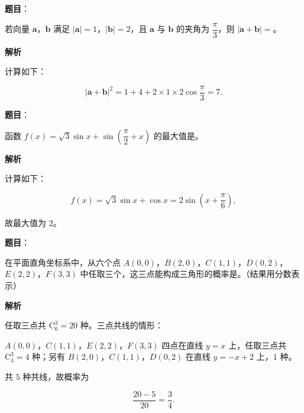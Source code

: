 \begin{answer}

\textbf{题目}：

若向量 $\boldsymbol a$，$\boldsymbol b$ 满足 $|\boldsymbol a|=1$，$|\boldsymbol b|=2$，且 $\boldsymbol a$ 与 $\boldsymbol b$ 的夹角为 $\dfrac{\pi}3$，则 $|\boldsymbol a+\boldsymbol b|=$\gkblank{}。

\textbf{解析}

计算如下：

\nopagebreak[4]
\[|\boldsymbol a+\boldsymbol b|^2=1+4+2\times1\times2\cos\frac{\pi}3=7.\]


\end{answer}
\begin{answer}

\textbf{题目}：

函数 $f(x)=\sqrt3\sin x+\sin\left(\dfrac{\pi}2+x\right)$ 的最大值是\gkblank{}。

\textbf{解析}

计算如下：

\nopagebreak[4]
\[f(x)=\sqrt3\sin x+\cos x=2\sin\left(x+\frac{\pi}6\right),\]

故最大值为 $2$。


\end{answer}
\begin{answer}

\textbf{题目}：

在平面直角坐标系中，从六个点 $A(0,0)$，$B(2,0)$，$C(1,1)$，$D(0,2)$，$E(2,2)$，$F(3,3)$ 中任取三个，这三点能构成三角形的概率是\gkblank{}。（结果用分数表示）

\textbf{解析}

任取三点共 $\mathrm C_6^3=20$ 种。三点共线的情形：

$A(0,0)$，$C(1,1)$，$E(2,2)$，$F(3,3)$ 四点在直线 $y=x$ 上，任取三点共 $\mathrm C_4^3=4$ 种；另有 $B(2,0)$，$C(1,1)$，$D(0,2)$ 在直线 $y=-x+2$ 上，$1$ 种。

共 $5$ 种共线，故概率为

\nopagebreak[4]
\[\frac{20-5}{20}=\frac34.\]


\end{answer}
